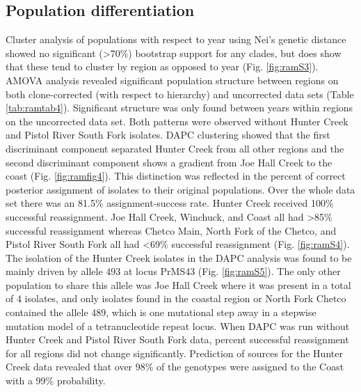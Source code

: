 \documentclass[double,12pt]{beavtex}
\begin{document}
  \subsection{Population
  differentiation}\label{population-differentiation}
  
  Cluster analysis of populations with respect to year using Nei's genetic
  distance showed no significant (\textgreater{}70\%) bootstrap support
  for any clades, but does show that these tend to cluster by region as
  opposed to year (Fig. \ref{fig:ramS3}). AMOVA analysis revealed
  significant population structure between regions on both clone-corrected
  (with respect to hierarchy) and uncorrected data sets (Table
  \ref{tab:ramtab4}). Significant structure was only found between years
  within regions on the uncorrected data set. Both patterns were observed
  without Hunter Creek and Pistol River South Fork isolates. DAPC
  clustering showed that the first discriminant component separated Hunter
  Creek from all other regions and the second discriminant component shows
  a gradient from Joe Hall Creek to the coast (Fig. \ref{fig:ramfig4}).
  This distinction was reflected in the percent of correct posterior
  assignment of isolates to their original populations. Over the whole
  data set there was an 81.5\% assignment-success rate. Hunter Creek
  received 100\% successful reassignment. Joe Hall Creek, Winchuck, and
  Coast all had \textgreater{}85\% successful reassignment whereas Chetco
  Main, North Fork of the Chetco, and Pistol River South Fork all had
  \textless{}69\% successful reassignment (Fig. \ref{fig:ramS4}). The
  isolation of the Hunter Creek isolates in the DAPC analysis was found to
  be mainly driven by allele 493 at locus PrMS43 (Fig. \ref{fig:ramS5}).
  The only other population to share this allele was Joe Hall Creek where
  it was present in a total of 4 isolates, and only isolates found in the
  coastal region or North Fork Chetco contained the allele 489, which is
  one mutational step away in a stepwise mutation model of a
  tetranucleotide repeat locus. When DAPC was run without Hunter Creek and
  Pistol River South Fork data, percent successful reassignment for all
  regions did not change significantly. Prediction of sources for the
  Hunter Creek data revealed that over 98\% of the genotypes were assigned
  to the Coast with a 99\% probability.
  
\end{document}
